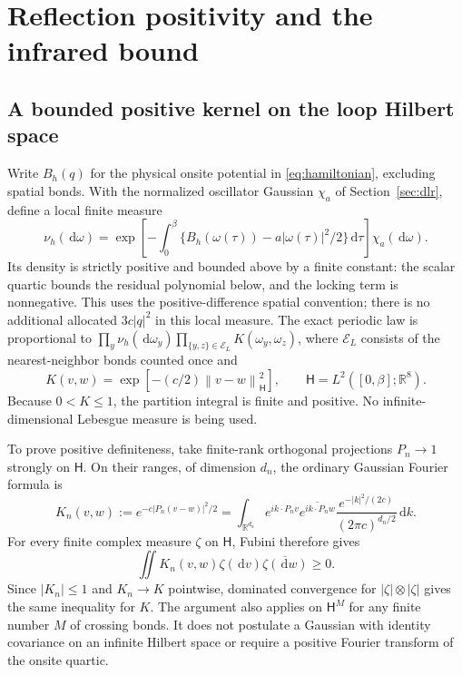 \documentclass[11pt]{article}
\numberwithin{equation}{section}
\theoremstyle{definition}
\newcommand{\R}{\mathbb R}
\newcommand{\dd}{\,\mathrm d}
\newcommand{\norm}[1]{\left\lVert#1\right\rVert}
\begin{document}
\section{Reflection positivity and the infrared bound}
\label{sec:infrared}

\subsection{A bounded positive kernel on the loop Hilbert space}
\label{sec:hilbert-kernel}

Write $B_h(q)$ for the physical onsite potential in
\eqref{eq:hamiltonian}, excluding spatial bonds.  With the normalized
oscillator Gaussian $\chi_a$ of Section~\ref{sec:dlr}, define a local finite
measure
\begin{equation}
 \nu_h(\dd\omega)=\exp\left[-\int_0^\beta
             \{B_h(\omega(\tau))-a|\omega(\tau)|^2/2\}\dd\tau\right]
             \chi_a(\dd\omega).
 \label{eq:rp-local-measure}
\end{equation}
Its density is strictly positive and bounded above by a finite constant:
the scalar quartic bounds the residual polynomial below, and the locking
term is nonnegative.  This uses the positive-difference spatial convention;
there is no additional allocated $3c|q|^2$ in this local measure.
The exact periodic law is proportional to
$\prod_y\nu_h(\dd\omega_y)\prod_{\{y,z\}\in\mathcal E_L}K(\omega_y,\omega_z)$,
where $\mathcal E_L$ consists of the nearest-neighbor bonds counted once and
\begin{equation}
 K(v,w)=\exp[-(c/2)\norm{v-w}_{\mathsf H}^2],\qquad
 \mathsf H=L^2([0,\beta];\R^8).
 \label{eq:crossing-kernel}
\end{equation}
Because $0<K\leq1$, the partition integral is finite and positive.
No infinite-dimensional Lebesgue measure is being used.

To prove positive definiteness, take finite-rank orthogonal projections
$P_n\to1$ strongly on $\mathsf H$.  On their ranges, of dimension $d_n$,
the ordinary Gaussian Fourier formula is
\[
 K_n(v,w):=e^{-c|P_n(v-w)|^2/2}
 =\int_{\R^{d_n}}e^{i k\cdot P_nv}
        \overline{e^{i k\cdot P_nw}}
        \frac{e^{-|k|^2/(2c)}}{(2\pi c)^{d_n/2}}\dd k.
\]
For every finite complex measure $\zeta$ on $\mathsf H$, Fubini therefore
gives
\begin{equation}
 \iint K_n(v,w)\zeta(\dd v)\overline{\zeta(\dd w)}\geq0.
 \label{eq:hilbert-kernel-positive}
\end{equation}
Since $|K_n|\leq1$ and $K_n\to K$ pointwise, dominated convergence for
$|\zeta|\otimes|\zeta|$ gives the same inequality for $K$.  The argument
also applies on $\mathsf H^M$ for any finite number $M$ of crossing bonds.
It does not postulate a Gaussian with identity covariance on an infinite
Hilbert space or require a positive Fourier transform of the onsite quartic.
\end{document}
